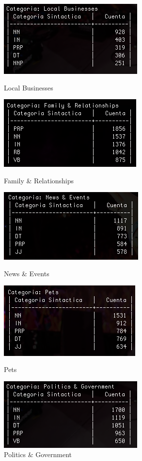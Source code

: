 \documentclass{article}
\begin{document}
\newpage
\begin{figure}
\centering
\includegraphics[scale=0.5]{figuras/cat16.png}
\caption{Local Businesses}
\label{fig:cat16}
\includegraphics[scale=0.5]{figuras/cat17.png}
\caption{Family \& Relationships}
\label{fig:cat17}
\includegraphics[scale=0.5]{figuras/cat18.png}
\caption{News \& Events}
\label{fig:cat18}
\includegraphics[scale=0.5]{figuras/cat19.png}
\caption{Pets}
\label{fig:cat19}
\includegraphics[scale=0.5]{figuras/cat20.png}
\caption{Politics \& Government}
\label{fig:cat20}
\end{figure}
\end{document}
